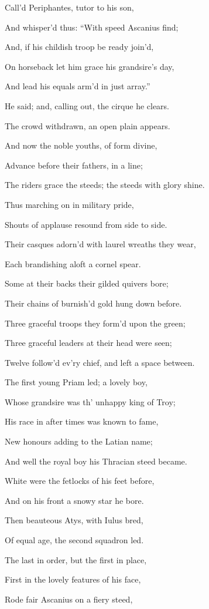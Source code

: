 Call’d Periphantes, tutor to his son,

And whisper’d thus: “With speed Ascanius find;

And, if his childish troop be ready join’d,

On horseback let him grace his grandsire’s day,

And lead his equals arm’d in just array.”

He said; and, calling out, the cirque he clears.

The crowd withdrawn, an open plain appears.

And now the noble youths, of form divine,

Advance before their fathers, in a line;

The riders grace the steeds; the steeds with glory shine.

Thus marching on in military pride,

Shouts of applause resound from side to side.

Their casques adorn’d with laurel wreaths they wear,

Each brandishing aloft a cornel spear.

Some at their backs their gilded quivers bore;

Their chains of burnish’d gold hung down before.

Three graceful troops they form’d upon the green;

Three graceful leaders at their head were seen;

Twelve follow’d ev’ry chief, and left a space between.

The first young Priam led; a lovely boy,

Whose grandsire was th’ unhappy king of Troy;

His race in after times was known to fame,

New honours adding to the Latian name;

And well the royal boy his Thracian steed became.

White were the fetlocks of his feet before,

And on his front a snowy star he bore.

Then beauteous Atys, with Iulus bred,

Of equal age, the second squadron led.

The last in order, but the first in place,

First in the lovely features of his face,

Rode fair Ascanius on a fiery steed,

